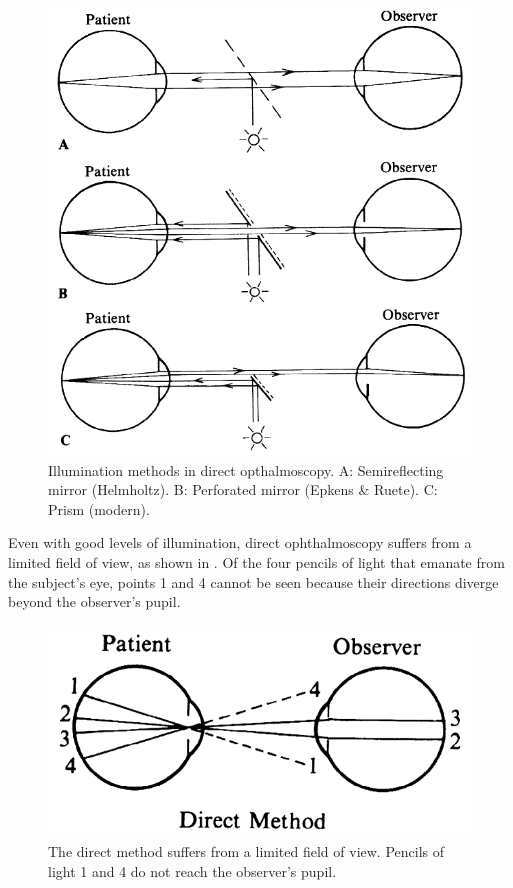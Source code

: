 \begin{figure}[htbp]
\centering
  \includegraphics{figures/illumination_methods}
\caption{Illumination methods in direct opthalmoscopy. A: Semireflecting mirror (Helmholtz). B: Perforated mirror (Epkens \& Ruete). C: Prism (modern).\cite{colenbrander2013principles}}
\label{fig:illum_methods}
\end{figure}

Even with good levels of illumination, direct ophthalmoscopy suffers from a limited field of view, as shown in .  Of the four pencils of light that emanate from the subject’s eye, points 1 and 4 cannot be seen because their directions diverge beyond the observer’s pupil.  

\begin{figure}[htbp]
\centering
  \includegraphics{figures/indirect_opthal}
\caption{The direct method suffers from a limited field of view. Pencils of light 1 and 4 do not reach the observer’s pupil.}
\label{fig:limited_direct}
\end{figure}


